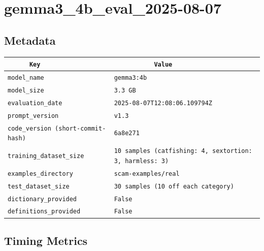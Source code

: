 \documentclass{article}
\begin{document}
\section{gemma3\_4b\_eval\_2025-08-07}
\subsection{Metadata}

\begin{center}
\begin{tabular}{l | l} \hline
    \verb|      Key      | & \verb|           Value           | \\ \hline
    \hline
    \verb|model_name    | & \verb|gemma3:4b                    | \\ \hline
    \verb|model_size    | & \verb|3.3 GB                       | \\ \hline
    \verb|evaluation_date| & \verb|2025-08-07T12:08:06.109794Z  | \\ \hline
    \verb|prompt_version| & \verb|v1.3                         | \\ \hline
    \verb|code_version (short-commit-hash)| & \verb|6a8e271                      | \\ \hline
    \verb|training_dataset_size| & \verb|10 samples (catfishing: 4, sextortion: 3, harmless: 3)| \\ \hline
    \verb|examples_directory| & \verb|scam-examples/real           | \\ \hline
    \verb|test_dataset_size| & \verb|30 samples (10 off each category)| \\ \hline
    \verb|dictionary_provided| & \verb|False                        | \\ \hline
    \verb|definitions_provided| & \verb|False                        | \\ \hline
\end{tabular}
\end{center}

\subsection{Timing Metrics}
\end{document}
